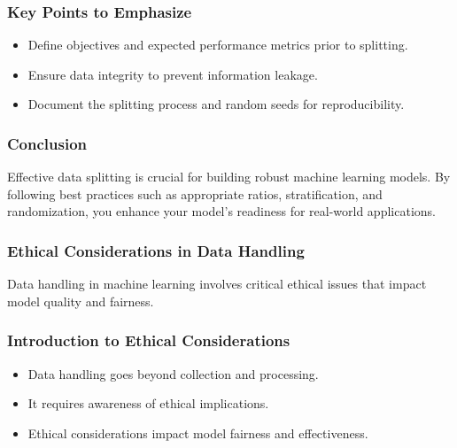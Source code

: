\documentclass[aspectratio=169]{beamer}
\begin{document}
\begin{frame}[fragile]
    \frametitle{Key Points to Emphasize}
    \begin{itemize}
        \item Define objectives and expected performance metrics prior to splitting.
        \item Ensure data integrity to prevent information leakage.
        \item Document the splitting process and random seeds for reproducibility.
    \end{itemize}
\end{frame}

\begin{frame}[fragile]
    \frametitle{Conclusion}
    Effective data splitting is crucial for building robust machine learning models. By following best practices such as appropriate ratios, stratification, and randomization, you enhance your model's readiness for real-world applications.
\end{frame}

\begin{frame}[fragile]
    \frametitle{Ethical Considerations in Data Handling}
    Data handling in machine learning involves critical ethical issues that impact model quality and fairness.
\end{frame}

\begin{frame}[fragile]
    \frametitle{Introduction to Ethical Considerations}
    \begin{itemize}
        \item Data handling goes beyond collection and processing.
        \item It requires awareness of ethical implications.
        \item Ethical considerations impact model fairness and effectiveness.
    \end{itemize}
\end{frame}
\end{document}
